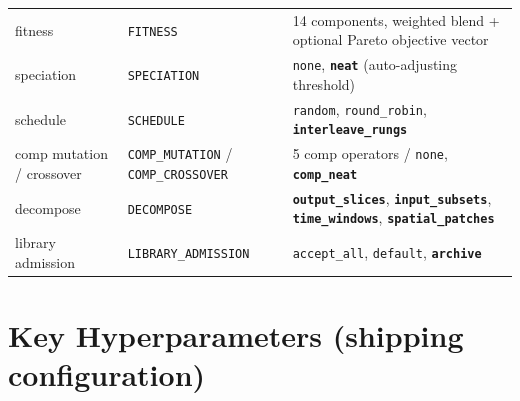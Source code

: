 \documentclass[11pt]{article}
\begin{document}
\begin{table}[htbp]
\begin{tabularx}{\textwidth}{@{}l l L@{}}
fitness & \texttt{FITNESS} & 14 components, weighted blend + optional Pareto objective vector \\
speciation & \texttt{SPECIATION} & \texttt{none}, \textbf{\texttt{neat}} (auto-adjusting threshold) \\
schedule & \texttt{SCHEDULE} & \texttt{random}, \texttt{round_robin}, \textbf{\texttt{interleave_rungs}} \\
comp mutation / crossover & \texttt{COMP_MUTATION} / \texttt{COMP_CROSSOVER} & 5 comp operators / \texttt{none}, \textbf{\texttt{comp_neat}} \\
decompose & \texttt{DECOMPOSE} & \textbf{\texttt{output_slices}}, \textbf{\texttt{input_subsets}}, \textbf{\texttt{time_windows}}, \textbf{\texttt{spatial_patches}} \\
library admission & \texttt{LIBRARY_ADMISSION} & \texttt{accept_all}, \texttt{default}, \textbf{\texttt{archive}} \\
\bottomrule
\end{tabularx}
\end{table}

\section{Key Hyperparameters (shipping configuration)}
\end{document}
